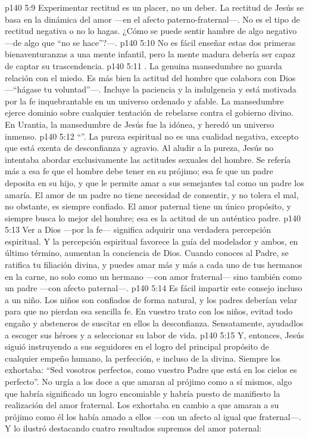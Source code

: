 \vs p140 5:9 Experimentar rectitud es un placer, no un deber. La rectitud de Jesús se basa en la dinámica del amor ---en el afecto paterno\hyp{}fraternal---. No es el tipo de rectitud negativa o no lo hagas. ¿Cómo se puede sentir hambre de algo negativo ---de algo que “no se hace”?---.
\vs p140 5:10 \pc No es fácil enseñar estas dos primeras bienaventuranzas a una mente infantil, pero la mente madura debería ser capaz de captar su trascendencia.
\vs p140 5:11 . La genuina mansedumbre no guarda relación con el miedo. Es más bien la actitud del hombre que colabora con Dios ---“hágase tu voluntad”---. Incluye la paciencia y la indulgencia y está motivada por la fe inquebrantable en un universo ordenado y afable. La mansedumbre ejerce dominio sobre cualquier tentación de rebelarse contra el gobierno divino. En Urantia, la mansedumbre de Jesús fue la idónea, y heredó un universo inmenso.
\vs p140 5:12 “”. La pureza espiritual no es una cualidad negativa, excepto que está exenta de desconfianza y agravio. Al aludir a la pureza, Jesús no intentaba abordar exclusivamente las actitudes sexuales del hombre. Se refería más a esa fe que el hombre debe tener en su prójimo; esa fe que un padre deposita en su hijo, y que le permite amar a sus semejantes tal como un padre los amaría. El amor de un padre no tiene necesidad de consentir, y no tolera el mal, no obstante, es siempre confiado. El amor paternal tiene un único propósito, y siempre busca lo mejor del hombre; esa es la actitud de un auténtico padre.
\vs p140 5:13 Ver a Dios ---por la fe--- significa adquirir una verdadera percepción espiritual. Y la percepción espiritual favorece la guía del modelador y ambos, en último término, aumentan la conciencia de Dios. Cuando conoces al Padre, se ratifica tu filiación divina, y puedes amar más y más a cada uno de tus hermanos en la carne, no solo como un hermano ---con amor fraternal--- sino también como un padre ---con afecto paternal---.
\vs p140 5:14 Es fácil impartir este consejo incluso a un niño. Los niños son confiados de forma natural, y los padres deberían velar para que no pierdan esa sencilla fe. En vuestro trato con los niños, evitad todo engaño y absteneros de suscitar en ellos la desconfianza. Sensatamente, ayudadlos a escoger sus héroes y a seleccionar su labor de vida.
\vs p140 5:15 \pc Y, entonces, Jesús siguió instruyendo a sus seguidores en el logro del principal propósito de cualquier empeño humano, la perfección, e incluso de la divina. Siempre los exhortaba: “Sed vosotros perfectos, como vuestro Padre que está en los cielos es perfecto”. No urgía a los doce a que amaran al prójimo como a sí mismos, algo que habría significado un logro encomiable y habría puesto de manifiesto la realización del amor fraternal. Los exhortaba en cambio a que amaran a su prójimo como él los había amado a ellos ---con un afecto  al igual que fraternal---. Y lo ilustró destacando cuatro resultados supremos del amor paternal:
